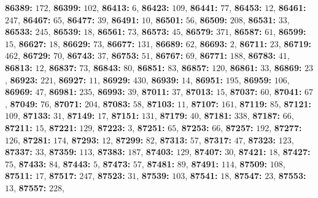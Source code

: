 \textsf{\bfseries 86389:} $172$, \textsf{\bfseries 86399:} $102$, \textsf{\bfseries 86413:} $6$, \textsf{\bfseries 86423:} $109$, \textsf{\bfseries 86441:} $77$, \textsf{\bfseries 86453:} $12$, \textsf{\bfseries 86461:} $247$, \textsf{\bfseries 86467:} $65$, \textsf{\bfseries 86477:} $39$, \textsf{\bfseries 86491:} $10$, \textsf{\bfseries 86501:} $56$, \textsf{\bfseries 86509:} $208$, \textsf{\bfseries 86531:} $33$, \textsf{\bfseries 86533:} $245$, \textsf{\bfseries 86539:} $18$, \textsf{\bfseries 86561:} $73$, \textsf{\bfseries 86573:} $45$, \textsf{\bfseries 86579:} $371$, \textsf{\bfseries 86587:} $61$, \textsf{\bfseries 86599:} $15$, \textsf{\bfseries 86627:} $18$, \textsf{\bfseries 86629:} $73$, \textsf{\bfseries 86677:} $131$, \textsf{\bfseries 86689:} $62$, \textsf{\bfseries 86693:} $2$, \textsf{\bfseries 86711:} $23$, \textsf{\bfseries 86719:} $462$, \textsf{\bfseries 86729:} $70$, \textsf{\bfseries 86743:} $37$, \textsf{\bfseries 86753:} $51$, \textsf{\bfseries 86767:} $69$, \textsf{\bfseries 86771:} $188$, \textsf{\bfseries 86783:} $41$, \textsf{\bfseries 86813:} $12$, \textsf{\bfseries 86837:} $73$, \textsf{\bfseries 86843:} $80$, \textsf{\bfseries 86851:} $83$, \textsf{\bfseries 86857:} $120$, \textsf{\bfseries 86861:} $33$, \textsf{\bfseries 86869:} $23$, \textsf{\bfseries 86923:} $221$, \textsf{\bfseries 86927:} $11$, \textsf{\bfseries 86929:} $430$, \textsf{\bfseries 86939:} $14$, \textsf{\bfseries 86951:} $195$, \textsf{\bfseries 86959:} $106$, \textsf{\bfseries 86969:} $47$, \textsf{\bfseries 86981:} $235$, \textsf{\bfseries 86993:} $39$, \textsf{\bfseries 87011:} $37$, \textsf{\bfseries 87013:} $15$, \textsf{\bfseries 87037:} $60$, \textsf{\bfseries 87041:} $67$, \textsf{\bfseries 87049:} $76$, \textsf{\bfseries 87071:} $204$, \textsf{\bfseries 87083:} $58$, \textsf{\bfseries 87103:} $11$, \textsf{\bfseries 87107:} $161$, \textsf{\bfseries 87119:} $85$, \textsf{\bfseries 87121:} $109$, \textsf{\bfseries 87133:} $31$, \textsf{\bfseries 87149:} $17$, \textsf{\bfseries 87151:} $131$, \textsf{\bfseries 87179:} $40$, \textsf{\bfseries 87181:} $338$, \textsf{\bfseries 87187:} $66$, \textsf{\bfseries 87211:} $15$, \textsf{\bfseries 87221:} $129$, \textsf{\bfseries 87223:} $3$, \textsf{\bfseries 87251:} $65$, \textsf{\bfseries 87253:} $66$, \textsf{\bfseries 87257:} $192$, \textsf{\bfseries 87277:} $126$, \textsf{\bfseries 87281:} $174$, \textsf{\bfseries 87293:} $12$, \textsf{\bfseries 87299:} $82$, \textsf{\bfseries 87313:} $57$, \textsf{\bfseries 87317:} $47$, \textsf{\bfseries 87323:} $123$, \textsf{\bfseries 87337:} $33$, \textsf{\bfseries 87359:} $113$, \textsf{\bfseries 87383:} $187$, \textsf{\bfseries 87403:} $129$, \textsf{\bfseries 87407:} $30$, \textsf{\bfseries 87421:} $18$, \textsf{\bfseries 87427:} $75$, \textsf{\bfseries 87433:} $84$, \textsf{\bfseries 87443:} $5$, \textsf{\bfseries 87473:} $57$, \textsf{\bfseries 87481:} $89$, \textsf{\bfseries 87491:} $114$, \textsf{\bfseries 87509:} $108$, \textsf{\bfseries 87511:} $17$, \textsf{\bfseries 87517:} $247$, \textsf{\bfseries 87523:} $31$, \textsf{\bfseries 87539:} $103$, \textsf{\bfseries 87541:} $18$, \textsf{\bfseries 87547:} $23$, \textsf{\bfseries 87553:} $13$, \textsf{\bfseries 87557:} $228$, 
